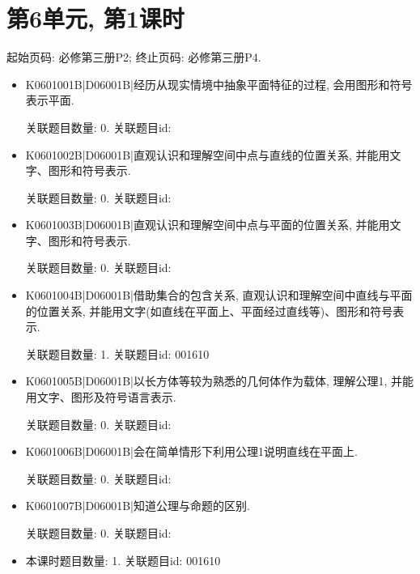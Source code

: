 \section*{第6单元, 第1课时}
起始页码: 必修第三册P2; 终止页码: 必修第三册P4.
\begin{itemize}
\item K0601001B|D06001B|经历从现实情境中抽象平面特征的过程, 会用图形和符号表示平面.

关联题目数量: 0. 关联题目id: 

\item K0601002B|D06001B|直观认识和理解空间中点与直线的位置关系, 并能用文字、图形和符号表示.

关联题目数量: 0. 关联题目id: 

\item K0601003B|D06001B|直观认识和理解空间中点与平面的位置关系, 并能用文字、图形和符号表示.

关联题目数量: 0. 关联题目id: 

\item K0601004B|D06001B|借助集合的包含关系, 直观认识和理解空间中直线与平面的位置关系, 并能用文字(如直线在平面上、平面经过直线等)、图形和符号表示.

关联题目数量: 1. 关联题目id: 001610

\item K0601005B|D06001B|以长方体等较为熟悉的几何体作为载体, 理解公理1, 并能用文字、图形及符号语言表示.

关联题目数量: 0. 关联题目id: 

\item K0601006B|D06001B|会在简单情形下利用公理1说明直线在平面上.

关联题目数量: 0. 关联题目id: 

\item K0601007B|D06001B|知道公理与命题的区别.

关联题目数量: 0. 关联题目id: 

\item 本课时题目数量: 1. 关联题目id: 001610

\end{itemize}

